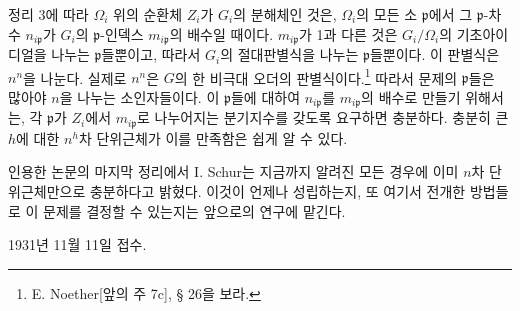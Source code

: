 정리 3에 따라 \(\Omega_i\) 위의 순환체 \(Z_i\)가 \(G_i\)의 분해체인 것은, \(\Omega_i\)의 모든 소 \(\mathfrak p\)에서 그 \(\mathfrak p\)-차수 \(n_{i\mathfrak p}\)가 \(G_i\)의 \(\mathfrak p\)-인덱스 \(m_{i\mathfrak p}\)의 배수일 때이다. \(m_{i\mathfrak p}\)가 1과 다른 것은 \(G_i/\Omega_i\)의 기초아이디얼을 나누는 \(\mathfrak p\)들뿐이고, 따라서 \(G_i\)의 절대판별식을 나누는 \(\mathfrak p\)들뿐이다. 이 판별식은 \(n^n\)을 나눈다. 실제로 \(n^n\)은 \(G\)의 한 비극대 오더의 판별식이다.\footnote{E. Noether[앞의 주 7c], § 26을 보라.} 따라서 문제의 \(\mathfrak p\)들은 많아야 \(n\)을 나누는 소인자들이다. 이 \(\mathfrak p\)들에 대하여 \(n_{i\mathfrak p}\)를 \(m_{i\mathfrak p}\)의 배수로 만들기 위해서는, 각 \(\mathfrak p\)가 \(Z_i\)에서 \(m_{i\mathfrak p}\)로 나누어지는 분기지수를 갖도록 요구하면 충분하다. 충분히 큰 \(h\)에 대한 \(n^h\)차 단위근체가 이를 만족함은 쉽게 알 수 있다.

인용한 논문의 마지막 정리에서 I. Schur는 지금까지 알려진 모든 경우에 이미 \(n\)차 단위근체만으로 충분하다고 밝혔다. 이것이 언제나 성립하는지, 또 여기서 전개한 방법들로 이 문제를 결정할 수 있는지는 앞으로의 연구에 맡긴다.

\begin{center}
1931년 11월 11일 접수.
\end{center}
